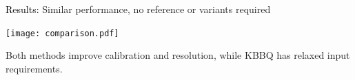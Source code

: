 \documentclass{beamer}
\begin{document}
\begin{frame}{}
\begin{columns}[T]
\begin{column}[T]{.5\linewidth}
\begin{block}{\textcolor{black}{Results:} Similar performance, no reference or variants required}
\begin{center}
\texttt{[image: comparison.pdf]}
\end{center}
Both methods improve calibration and resolution, while KBBQ has relaxed input requirements.
\end{block}


\end{column}
\end{columns}
\end{frame}
\end{document}
